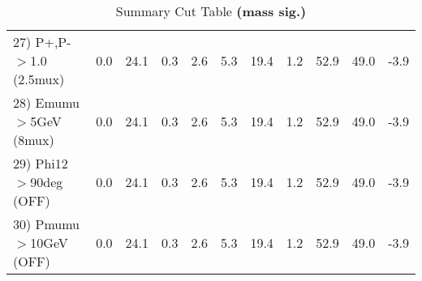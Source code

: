 \begin{table}[h!]
{{\begin{tabular}{||l||r|r|r|r|r|r|r||r||r||r||}
 27) P+,P-$>$1.0 (2.5mux) &       0.0 &      24.1 &       0.3 &       2.6 &       5.3 &      19.4 &       1.2 &      52.9 &      49.0 &      -3.9 \\
 28) Emumu$>$5GeV  (8mux) &       0.0 &      24.1 &       0.3 &       2.6 &       5.3 &      19.4 &       1.2 &      52.9 &      49.0 &      -3.9 \\
 29) Phi12$>$90deg  (OFF) &       0.0 &      24.1 &       0.3 &       2.6 &       5.3 &      19.4 &       1.2 &      52.9 &      49.0 &      -3.9 \\
 30) Pmumu$>$10GeV  (OFF) &       0.0 &      24.1 &       0.3 &       2.6 &       5.3 &      19.4 &       1.2 &      52.9 &      49.0 &      -3.9 \\
 \hline
 \hline
 \end{tabular}
 \caption{Summary Cut Table \textbf{ (mass sig.) }}
 \label{tab-sumcut}
 }}
 \end{table}
 \endinput
